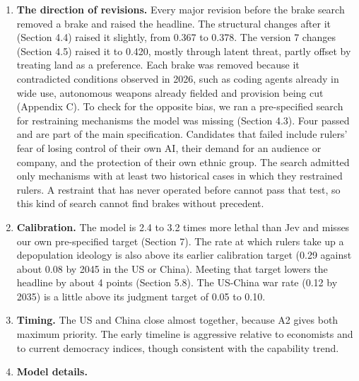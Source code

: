 \documentclass[
  10pt,
]{article}
\providecommand{\tightlist}{%
  \setlength{\itemsep}{0pt}\setlength{\parskip}{0pt}}
\begin{document}
\begin{enumerate}
  \begin{itemize}
  \tightlist
  \item
    \textbf{A4.} Once force is automated, refusal by the people who carry out orders no longer
    applies, and nearly every path to the outcome requires closure (Section 5.3). Switching off
    security-force defection leaves the headline at 0.415. Keeping humans in the loop of automated
    force is a policy lever (Section 6.1).
  \item
    \textbf{A5.} Keeping a safety net is also a policy choice, and it is not current reality. The
    model already lets democratic provision respond to grievance while democracy lasts. A variant
    with a more generous starting default (warehousing instead of the status quo) moves the headline
    little (0.395 against 0.415).
  \end{itemize}
\item
  \textbf{The direction of revisions.} Every major revision before the brake search removed a brake
  and raised the headline. The structural changes after it (Section 4.4) raised it slightly, from
  0.367 to 0.378. The version 7 changes (Section 4.5) raised it to 0.420, mostly through latent
  threat, partly offset by treating land as a preference. Each brake was removed because it
  contradicted conditions observed in 2026, such as coding agents already in wide use, autonomous
  weapons already fielded and provision being cut (Appendix C). To check for the opposite bias, we
  ran a pre-specified search for restraining mechanisms the model was missing (Section 4.3). Four
  passed and are part of the main specification. Candidates that failed include rulers' fear of
  losing control of their own AI, their demand for an audience or company, and the protection of
  their own ethnic group. The search admitted only mechanisms with at least two historical cases in
  which they restrained rulers. A restraint that has never operated before cannot pass that test, so
  this kind of search cannot find brakes without precedent.
\item
  \textbf{Calibration.} The model is 2.4 to 3.2 times more lethal than Jev and misses our own
  pre-specified target (Section 7). The rate at which rulers take up a depopulation ideology is also
  above its earlier calibration target (0.29 against about 0.08 by 2045 in the US or China). Meeting
  that target lowers the headline by about 4 points (Section 5.8). The US-China war rate (0.12 by
  2035) is a little above its judgment target of 0.05 to 0.10.
\item
  \textbf{Timing.} The US and China close almost together, because A2 gives both maximum priority.
  The early timeline is aggressive relative to economists and to current democracy indices, though
  consistent with the capability trend.
\item
  \textbf{Model details.}


\end{enumerate}
\end{document}
